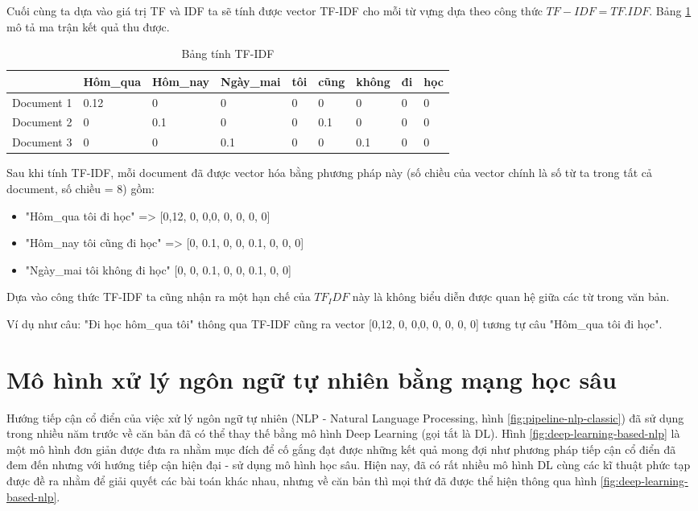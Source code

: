 Cuối cùng ta dựa vào giá trị TF và IDF ta sẽ tính được vector TF-IDF cho mỗi từ vựng dựa theo công thức \(TF-IDF = TF . IDF\). Bảng \ref{tab:sec3caltfidf} mô tả ma trận kết quả thu được. 

\begin{table}[h!]
\centering
\begin{tabular}{|l|l|l|l|l|l|l|l|l|}
\hline
  & Hôm\_qua & Hôm\_nay & Ngày\_mai & tôi    & cũng   & không   & đi  & học \\ \hline
Document 1     & 0.12     & 0 & 0  & 0    & 0    & 0 & 0 & 0 \\ \hline
Document 2     & 0     & 0.1    & 0  & 0 & 0.1 & 0    & 0    & 0    \\ \hline
Document 3     & 0     & 0 & 0.1     & 0 & 0 & 0.1    & 0    & 0    \\ \hline
\end{tabular}
\caption{Bảng tính TF-IDF}
\label{tab:sec3caltfidf}
\end{table}
\newpage

Sau khi tính TF-IDF, mỗi document đã được vector hóa bằng phương pháp này (số chiều của vector chính là số từ ta trong tất cả document, số chiều = 8) gồm:

\begin{itemize}
    \item "Hôm\_qua tôi đi học" =>  [0,12, 0, 0,0, 0, 0, 0, 0]
    \item  "Hôm\_nay tôi cũng đi học" => [0, 0.1, 0, 0, 0.1, 0, 0, 0]
    \item "Ngày\_mai tôi không đi học" [0, 0, 0.1, 0, 0, 0.1, 0, 0]
\end{itemize}

Dựa vào công thức TF-IDF ta cũng nhận ra một hạn chế của $TF_IDF$ này là không biểu diễn được quan hệ giữa các từ trong văn bản.

Ví dụ như câu: "Đi học hôm\_qua tôi" thông qua TF-IDF cũng ra vector [0,12, 0, 0,0, 0, 0, 0, 0] tương tự câu "Hôm\_qua tôi đi học".

\section{Mô hình xử lý ngôn ngữ tự nhiên bằng mạng học sâu}
Hướng tiếp cận cổ điển của việc xử lý ngôn ngữ tự nhiên (NLP - Natural Language Processing, hình \ref{fig:pipeline-nlp-classic}) đã sử dụng trong nhiều năm trước về căn bản đã có thể thay thế bằng mô hình Deep Learning (gọi tắt là DL). Hình \ref{fig:deep-learning-based-nlp} là một mô hình đơn giản được đưa ra nhằm mục đích để  cố gắng đạt được những kết quả mong đợi như phương pháp tiếp cận cổ điển đã đem đến nhưng với hướng tiếp cận hiện đại - sử dụng mô hình học sâu. Hiện nay, đã có rất nhiều mô hình DL cùng các kĩ thuật phức tạp được đề ra nhằm để giải quyết các bài toán khác nhau, nhưng về căn bản thì mọi thứ đã được thể hiện thông qua hình \ref{fig:deep-learning-based-nlp}.

